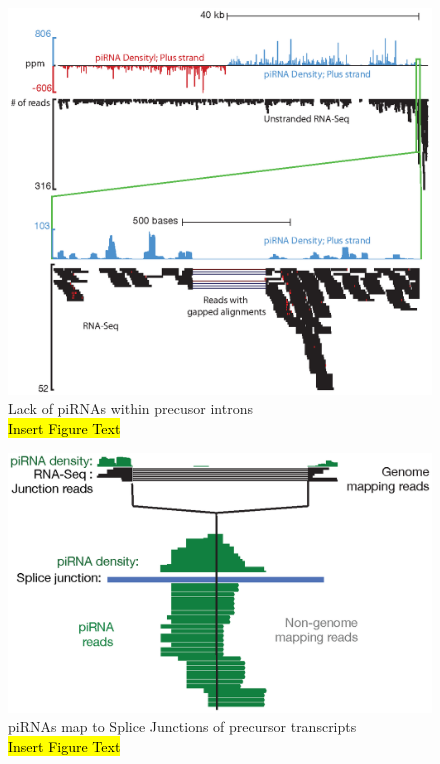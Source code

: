  \begin{figure} %
    \centering 
    \includegraphics{Figures/AppendixB/noPiRNAswithinPrecusorIntrons.eps}
    \caption[Lack of piRNAs within precusor introns]
    {
      Lack of piRNAs within precusor introns\\[0.25cm]
      \hl{Insert Figure Text}
      }
    \label{SeqZipMethod:fig:no piRNAs within Precursor Introns}
    \end{figure}

  \begin{figure} %
    \centering 
    \includegraphics{Figures/AppendixB/smallRNAsMapToPrecursorSJ.eps}
    \caption[piRNAs map to Splice Junctions of precursor transcripts]
    {
      piRNAs map to Splice Junctions of precursor transcripts\\[0.25cm]
      \hl{Insert Figure Text}
      }
    \label{SeqZipMethod:fig: piRNAs map to SJ}
    \end{figure}

